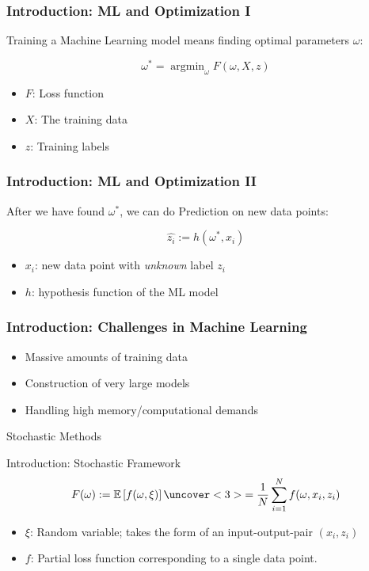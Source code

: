 \documentclass[10pt]{beamer}
\DeclareMathOperator{\argmin}{argmin}
\begin{document}
  \begin{frame}\frametitle{Introduction: ML and Optimization I}
    \alert{Training} a Machine Learning model means finding optimal parameters $\omega$:

    $$ \omega^* = \argmin_{\omega} F(\omega, X, z)$$
    
    \begin{itemize}
      \item \alert{$F$}: Loss function
      \item \alert{$X$}: The training data
      \item \alert{$z$}: Training labels
    \end{itemize}   
  \end{frame}

  \begin{frame}\frametitle{Introduction: ML and Optimization II}
    After we have found $\omega^*$, we can do \alert{Prediction} on new data points:

    $$ \hat {z_i} := h(\omega^*, x_i)$$
    
    \begin{itemize}
      \item \alert{$x_i$}: new data point with \emph{unknown} label \alert{$z_i$}
      \item \alert{$h$}: hypothesis function of the ML model
    \end{itemize}   
  \end{frame}

  \begin{frame}
    \frametitle{Introduction: Challenges in Machine Learning}
      \begin{itemize}
        \item Massive amounts of training data 
        \item Construction of very large models
        \item Handling high memory/computational demands
      \end{itemize}
      \vspace{35pt}
    \centering \huge{\alert{Stochastic Methods}}
  \end{frame}
  
  \begin{frame}{Introduction: Stochastic Framework}
    $$ F(\omega) := \mathbb{E}\left[f(\omega, \xi)\right] \uncover<3>{= \frac{1}{N}\sum_{i=1}^N f(\omega, x_i, z_i)}$$
    \begin{itemize}
      \item<2-> \alert{$\xi$}: Random variable; takes the form of an input-output-pair $(x_i, z_i)$
      \item<3-> \alert{$f$}: Partial loss function corresponding to a single data point.
    \end{itemize}
  \end{frame}
\end{document}
